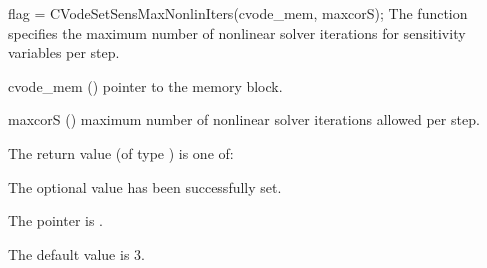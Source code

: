 {
  flag = CVodeSetSensMaxNonlinIters(cvode\_mem, maxcorS);
}
{
  The function  specifies the maximum
  number of nonlinear solver iterations for sensitivity variables per step.
}
{
  \begin{args}
  \item[cvode\_mem] ()
    pointer to the {\cvodes} memory block.
  \item[maxcorS] ()
    maximum number of nonlinear solver iterations allowed per step.
  \end{args}
}
{
  The return value  (of type ) is one of:
  \begin{args}
  \item[\Id{CV\_SUCCESS}] 
    The optional value has been successfully set.
  \item[\Id{CV\_MEM\_NULL}]
    The  pointer is .
  \end{args}
}
{
  The default value is $3$.
}

